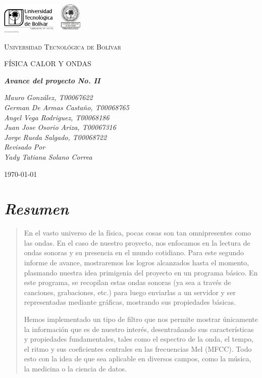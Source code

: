 \documentclass[letterpaper, 12pt]{article}
\begin{document}
\begin{titlepage}
	\centering
	\includegraphics[width=0.3\textwidth]{Images/logo_utb.png}\par\vspace{1cm}
	{\scshape\LARGE Universidad Tecnológica de Bolívar \par}
	\vspace{1cm}

	{\scshape\Large FÍSICA CALOR Y ONDAS \par}
	\vspace{2.5cm}

	\slshape {\Large \bfseries{} Avance del proyecto No. II \\}
	\vspace{2cm}

	\slshape {\itshape{} Mauro González, T00067622 \\}
	\slshape {\itshape{} German De Armas Castaño, T00068765 \\}
	\slshape {\itshape{} Angel Vega Rodriguez, T00068186 \\}
	\slshape {\itshape{} Juan Jose Osorio Ariza, T00067316 \\}
	\slshape {\itshape{} Jorge Rueda Salgado, T00068722 \\}
	\vfill
	Revisado Por \\
	Yady Tatiana Solano Correa\\
	{\large \today\par}
\end{titlepage}

\section*{\textit{Resumen}}

\begin{quote}
	En el vasto universo de la física, pocas cosas son tan omnipresentes
	como las ondas. En el caso de nuestro proyecto, nos enfocamos en
	la lectura de ondas sonoras y su presencia en el mundo cotidiano.
	Para este segundo informe de avance, mostraremos los logros alcanzados
	hasta el momento, plasmando nuestra idea primigenia del proyecto en un
	programa básico. En este programa, se recopilan estas ondas
	sonoras (ya sea a través de canciones, grabaciones, etc.) para
	luego enviarlas a un servidor y ser representadas mediante
	gráficas, mostrando sus propiedades básicas.

	Hemos implementado un tipo de filtro que nos permite
	mostrar únicamente la información que es de nuestro
	interés, desentrañando sus características y propiedades
	fundamentales, tales como el espectro de la onda, el tempo,
	el ritmo y sus coeficientes centrales en las frecuencias
	Mel (MFCC). Todo esto con la idea de que sea aplicable en
	diversos campos, como la música, la medicina o la ciencia
	de datos.
\end{quote}
\end{document}
